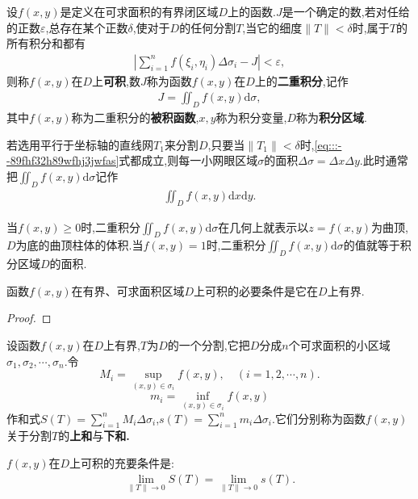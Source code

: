 \documentclass[../../main.tex]{subfiles}%
\begin{document}
\begin{definition}
设$f(x,y)$是定义在可求面积的有界闭区域$D$上的函数.$J$是一个确定的数,若对任给的正数$\varepsilon$,总存在某个正数$\delta$,使对于$D$的任何分割$T$,当它的细度$\| T \| < \delta$时,属于$T$的所有积分和都有
\begin{align}
\left| \sum_{i=1}^n f(\xi_i,\eta_i)\Delta \sigma_i - J \right| < \varepsilon, \label{eq:::--89fhf32h89wfhj3jwfas}
\end{align}
则称$f(x,y)$在$D$上\textbf{可积},数$J$称为函数$f(x,y)$在$D$上的\textbf{二重积分},记作
\begin{align*}
J = \iint_D f(x,y)\mathrm{d}\sigma, 
\end{align*}
其中$f(x,y)$称为二重积分的\textbf{被积函数},$x,y$称为积分变量,$D$称为\textbf{积分区域}.

若选用平行于坐标轴的直线网$T_1$来分割$D$,只要当$\| T_1 \| < \delta$时,\eqref{eq:::--89fhf32h89wfhj3jwfas}式都成立,则每一小网眼区域$\sigma$的面积$\Delta \sigma = \Delta x \Delta y$.此时通常把$\iint_D f(x,y)\mathrm{d}\sigma$记作
\begin{align*}
\iint_D f(x,y)\mathrm{d}x\mathrm{d}y. 
\end{align*}
\end{definition}
\begin{remark}
当$f(x,y) \geqslant 0$时,二重积分$\iint_D f(x,y)\mathrm{d}\sigma$在几何上就表示以$z=f(x,y)$为曲顶,$D$为底的曲顶柱体的体积.当$f(x,y)=1$时,二重积分$\iint_D f(x,y)\mathrm{d}\sigma$的值就等于积分区域$D$的面积.
\end{remark}

\begin{theorem}
函数$f(x,y)$在有界、可求面积区域$D$上可积的必要条件是它在$D$上有界.
\end{theorem}
\begin{proof}

\end{proof}

\begin{definition}
设函数$f(x,y)$在$D$上有界,$T$为$D$的一个分割,它把$D$分成$n$个可求面积的小区域$\sigma_1,\sigma_2,\cdots,\sigma_n$.令
\[
M_i = \sup\limits_{(x,y) \in \sigma_i} f(x,y), \quad (i = 1,2,\cdots,n).
\]
\[
m_i = \inf\limits_{(x,y) \in \sigma_i} f(x,y)
\]
作和式$S(T) = \sum_{i=1}^n M_i \Delta \sigma_i$,$s(T) = \sum_{i=1}^n m_i \Delta \sigma_i$.它们分别称为函数$f(x,y)$关于分割$T$的\textbf{上和}与\textbf{下和.}
\end{definition}

\begin{theorem}\label{theorem:数分--定理21.4}
$f(x,y)$在$D$上可积的充要条件是:
\begin{align*}
\lim_{\| T \| \to 0} S(T) = \lim_{\| T \| \to 0} s(T).
\end{align*}
\end{theorem}
\end{document}
